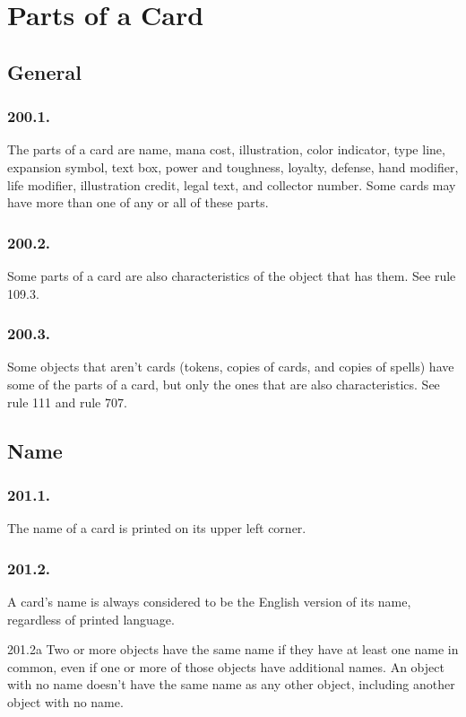 \chapter{Parts of a Card}
\setcounter{section}{199}
\section{General}
\subsection*{200.1.}
The parts of a card are name, mana cost, illustration, color indicator, type line, expansion symbol, text box, power and toughness, loyalty, defense, hand modifier, life modifier, illustration credit, legal text, and collector number. Some cards may have more than one of any or all of these parts.

\subsection*{200.2.}
Some parts of a card are also characteristics of the object that has them. See rule 109.3.

\subsection*{200.3.}
Some objects that aren’t cards (tokens, copies of cards, and copies of spells) have some of the parts of a card, but only the ones that are also characteristics. See rule 111 and rule 707.

\section{Name}
\subsection*{201.1.}
The name of a card is printed on its upper left corner.

\subsection*{201.2.}
A card’s name is always considered to be the English version of its name, regardless of printed language.

201.2a Two or more objects have the same name if they have at least one name in common, even if one or more of those objects have additional names. An object with no name doesn’t have the same name as any other object, including another object with no name.

